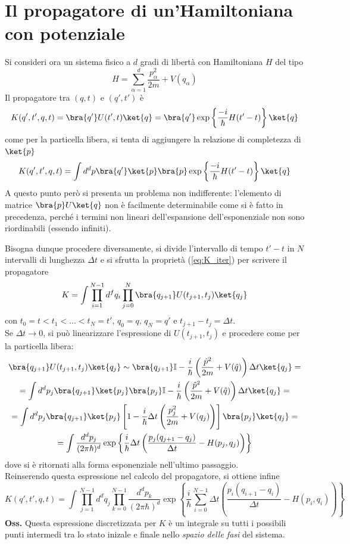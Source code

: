 \newpage
\section{Il propagatore di un'Hamiltoniana con potenziale}
Si consideri ora un sistema fisico a $d$ gradi di libertà con Hamiltoniana $H$ del tipo
$$H = \sum_{\alpha=1}^{d}\frac{p^2_\alpha}{2m} + V(q_\alpha)$$
Il propagatore tra $(q,t)$ e $(q',t')$ è
$$K(q',t',q,t) = \bra{q'}U(t',t)\ket{q} = \bra{q'}\exp\left\{\frac{-i}{\hbar}H(t'-t)\right\}\ket{q}$$
come per la particella libera, si tenta di aggiungere la relazione di completezza di $\ket{p}$
$$K(q',t',q,t) = \int d^dp\bra{q'}\ket{p}\bra{p}\exp\left\{\frac{-i}{\hbar}H(t'-t)\right\}\ket{q}$$
A questo punto però si presenta un problema non indifferente:
l'elemento di matrice $\bra{p}U\ket{q}$ non è facilmente determinabile come si è fatto in precedenza,
perché i termini non lineari dell'espansione dell'esponenziale non sono riordinabili
(essendo infiniti).

Bisogna dunque procedere diversamente, si divide l'intervallo di tempo $t'-t$ in $N$ intervalli di
lunghezza $\Delta t$ e si sfrutta la proprietà (\ref{eq:K_iter}) per scrivere il propagatore
$$K=\int \prod_{i=1}^{N-1} d^fq_i \prod_{j=0}^{N}\bra{q_{j+1}}U(t_{j+1},t_j)\ket{q_j}$$
con $t_0=t<t_1<...<t_N=t'$, $q_0=q$, $q_N=q'$ e $t_{j+1}-t_{j}=\Delta t$.\\
Se $\Delta t \to0$, si può linearizzare l'espressione di $U(t_{j+1},t_j)$ e procedere come
per la particella libera:
\begin{gather*}
\bra{q_{j+1}}U(t_{j+1},t_j)\ket{q_j}\sim \bra{q_{j+1}}\mathbb{I}-\frac{i}{\hbar}\left(\frac{\hat p^2}{2m}+V(\hat q)
\right)\Delta t\ket{q_j}=\\
=\int d^dp_j \bra{q_{j+1}}\ket{p_j}\bra{p_j}\mathbb{I}-\frac{i}{\hbar}\left(\frac{\hat p^2}{2m}+
V(\hat q)\right)\Delta t\ket{q_j}=\\
=\int d^dp_j \bra{q_{j+1}}\ket{p_j}\left[1-\frac{i}{\hbar}\Delta t\left(\frac{p_j^2}{2m}+V(q_j)
\right)\right]\bra{p_j}\ket{q_j}=\\
=\int \frac{d^dp_j}{(2\pi\hbar)^d}\exp\left\{\frac{i}{\hbar}\Delta t\left(\frac{p_j(q_{j+1}-q_j)}
{\Delta t} - H(p_j,q_j)\right)\right\}
\end{gather*}
dove si è ritornati alla forma esponenziale nell'ultimo passaggio.\\
Reinserendo questa espressione nel calcolo del propagatore, si ottiene infine
\begin{equation}
\boxed{K(q',t',q,t) = \int\prod_{j=1}^{N-1}d^dq_j\prod_{k=0}^{N-1}\frac{d^dp_k}{(2\pi\hbar)^d}
\exp\left\{\frac{i}{\hbar}\sum_{i=0}^{N-1}\Delta t \left(\frac{p_i(q_{i+1}-q_i)}{\Delta t}-H(p_i,q_i)
\right)\right\}}
\label{eq:K_discr}
\end{equation}
\textbf{Oss.} Questa espressione discretizzata per $K$ è un integrale su tutti i possibili punti
intermedi tra lo stato inizale e finale nello \textit{spazio delle fasi} del sistema.

